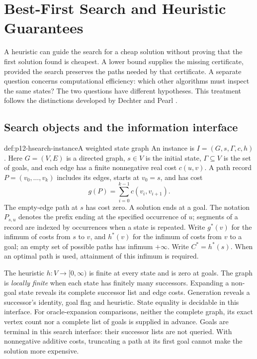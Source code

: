 \chapter{Best-First Search and Heuristic Guarantees}
\label{sec:p12-best-first-search-and-heuristic-guarantees}

A heuristic can guide the search for a cheap solution without proving that
the first solution found is cheapest. A lower bound supplies the missing
certificate, provided the search preserves the paths needed by that
certificate. A separate question concerns computational efficiency: which
other algorithms must inspect the same states? The two questions have
different hypotheses. This treatment follows the distinctions developed by
Dechter and Pearl \cite{DechterPearl1985BestFirst}.

\section{Search objects and the information interface}

\begin{hbdefinition}{def:p12-hsearch-instance}{A weighted state graph}
An instance is \(I=(G,s,\Gamma,c,h)\). Here \(G=(V,E)\) is a directed
graph, \(s\in V\) is the initial state, \(\Gamma\subseteq V\) is the set
of goals, and each edge has a finite nonnegative real cost \(c(u,v)\).
A path record \(P=(v_0,\ldots,v_k)\) includes its edges, starts at
\(v_0=s\), and has cost
\[
 g(P)=\sum_{i=0}^{k-1}c(v_i,v_{i+1}).
\]
The empty-edge path at \(s\) has cost zero. A solution ends at a goal.
The notation \(P_{s,u}\) denotes the prefix ending at the specified
occurrence of \(u\); segments of a record are indexed by occurrences
when a state is repeated.
Write \(g^*(v)\) for the infimum of costs from \(s\) to \(v\), and
\(h^*(v)\) for the infimum of costs from \(v\) to a goal; an empty
set of possible paths has infimum \(+\infty\). Write \(C^*=h^*(s)\).
When an optimal path is used, attainment of this infimum is required.

The heuristic \(h:V\to[0,\infty)\) is finite at every state and is
zero at goals. The graph is \emph{locally finite} when each state has
finitely many successors. Expanding a non-goal state reveals its complete
successor list and edge costs. Generation reveals a successor's identity,
goal flag and heuristic. State equality is decidable in this interface.
For oracle-expansion comparisons, neither the complete graph, its exact
vertex count nor a complete list of goals is supplied in advance.
Goals are terminal in this search interface: their successor lists are
not queried. With nonnegative additive costs, truncating a path at its
first goal cannot make the solution more expensive.
\end{hbdefinition}

